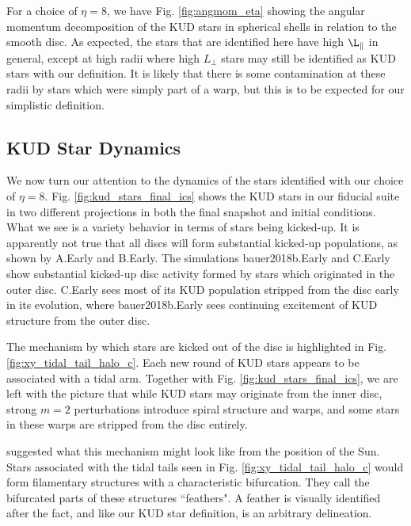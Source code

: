 For a choice of $\eta=8$, we have Fig. \ref{fig:angmom_eta} showing the angular momentum decomposition of the KUD stars in spherical shells in relation to the smooth disc. As expected, the stars that are identified here have high $\L_\parallel$ in general, except at high radii where high $L_\perp$ stars may still be identified as KUD stars with our definition. It is likely that there is some contamination at these radii by stars which were simply part of a warp, but this is to be expected for our simplistic definition.


\subsection{KUD Star Dynamics} \label{ssec:kud_dynamics}


We now turn our attention to the dynamics of the stars identified with our choice of $\eta=8$. Fig. \ref{fig:kud_stars_final_ics} shows the KUD stars in our fiducial suite in two different projections in both the final snapshot and initial conditions. What we see is a variety behavior in terms of stars being kicked-up. It is apparently not true that all discs will form substantial kicked-up populations, as shown by A.Early  and B.Early. The simulations bauer2018b.Early and C.Early show substantial kicked-up disc activity formed by stars which originated in the outer disc. C.Early sees most of its KUD population stripped from the disc early in its evolution, where bauer2018b.Early sees continuing excitement of KUD structure from the outer disc. 



The mechanism by which stars are kicked out of the disc is highlighted in Fig. \ref{fig:xy_tidal_tail_halo_c}. Each new round of KUD stars appears to be associated with a tidal arm. Together with Fig. \ref{fig:kud_stars_final_ics}, we are left  with the picture that while KUD stars may originate from the inner disc, strong $m=2$ perturbations introduce spiral structure and warps, and some stars in these warps are stripped from the disc entirely. 



\citet{laporte_2019_feathers} suggested what this mechanism might look like from the position of the Sun. Stars associated with the tidal tails seen in Fig. \ref{fig:xy_tidal_tail_halo_c} would form filamentary structures with a characteristic bifurcation. They call the bifurcated parts of these structures ``feathers". A feather is visually identified after the fact, and like our KUD star definition, is an arbitrary delineation.

